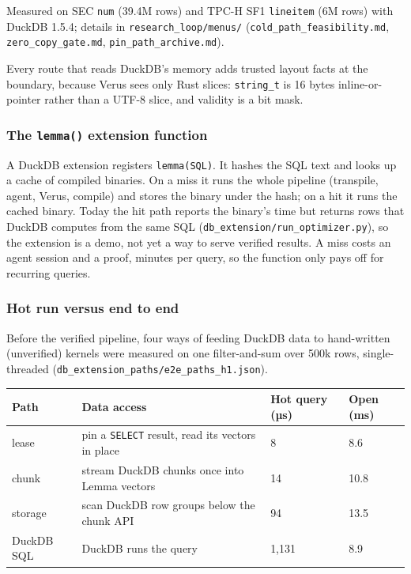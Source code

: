 \documentclass[
]{article}
\newcounter{none} %
\begin{document}
Measured on SEC \texttt{num} (39.4M rows) and TPC-H SF1
\texttt{lineitem} (6M rows) with DuckDB 1.5.4; details in
\texttt{research\_loop/menus/} (\texttt{cold\_path\_feasibility.md},
\texttt{zero\_copy\_gate.md}, \texttt{pin\_path\_archive.md}).

Every route that reads DuckDB's memory adds trusted layout facts at the
boundary, because Verus sees only Rust slices: \texttt{string\_t} is 16
bytes inline-or-pointer rather than a UTF-8 slice, and validity is a bit
mask.

\subsubsection{\texorpdfstring{The \texttt{lemma()} extension
function}{The lemma() extension function}}\label{the-lemma-extension-function}

A DuckDB extension registers
\texttt{lemma(\textquotesingle{}SQL\textquotesingle{})}. It hashes the
SQL text and looks up a cache of compiled binaries. On a miss it runs
the whole pipeline (transpile, agent, Verus, compile) and stores the
binary under the hash; on a hit it runs the cached binary. Today the hit
path reports the binary's time but returns rows that DuckDB computes
from the same SQL (\texttt{db\_extension/run\_optimizer.py}), so the
extension is a demo, not yet a way to serve verified results. A miss
costs an agent session and a proof, minutes per query, so the function
only pays off for recurring queries.

\subsubsection{Hot run versus end to
end}\label{hot-run-versus-end-to-end}

Before the verified pipeline, four ways of feeding DuckDB data to
hand-written (unverified) kernels were measured on one filter-and-sum
over 500k rows, single-threaded
(\texttt{db\_extension\_paths/e2e\_paths\_h1.json}).

{\def\LTcaptype{none} %
\begin{longtable}[]{@{}llll@{}}
\toprule\noalign{}
Path & Data access & Hot query (µs) & Open (ms) \\
\midrule\noalign{}
\endhead
\bottomrule\noalign{}
\endlastfoot
lease & pin a \texttt{SELECT} result, read its vectors in place & 8 &
8.6 \\
chunk & stream DuckDB chunks once into Lemma vectors & 14 & 10.8 \\
storage & scan DuckDB row groups below the chunk API & 94 & 13.5 \\
DuckDB SQL & DuckDB runs the query & 1,131 & 8.9 \\
\end{longtable}
}
\end{document}
